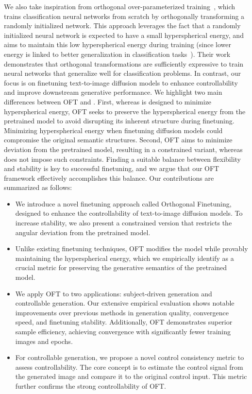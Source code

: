 We also take inspiration from orthogonal over-parameterized training~\cite{liu2021orthogonal}, which trains classification neural networks from scratch by orthogonally transforming a randomly initialized network. This approach leverages the fact that a randomly initialized neural network is expected to have a small hyperspherical energy, and \cite{liu2021orthogonal} aims to maintain this low hyperspherical energy during training (since lower energy is linked to better generalization in classification tasks~\cite{liu2018learning,lin2020regularizing}). Their work demonstrates that orthogonal transformations are sufficiently expressive to train neural networks that generalize well for classification problems. In contrast, our focus is on finetuning text-to-image diffusion models to enhance controllability and improve downstream generative performance. We highlight two main differences between OFT and \cite{liu2021orthogonal}. First, whereas \cite{liu2021orthogonal} is designed to minimize hyperspherical energy, OFT seeks to preserve the hyperspherical energy from the pretrained model to avoid disrupting its inherent structure during finetuning. Minimizing hyperspherical energy when finetuning diffusion models could compromise the original semantic structures. Second, OFT aims to minimize deviation from the pretrained model, resulting in a constrained variant, whereas \cite{liu2021orthogonal} does not impose such constraints. Finding a suitable balance between flexibility and stability is key to successful finetuning, and we argue that our OFT framework effectively accomplishes this balance. Our contributions are summarized as follows:

\begin{itemize}[leftmargin=*,nosep]

    \item We introduce a novel finetuning approach called Orthogonal Finetuning, designed to enhance the controllability of text-to-image diffusion models. To increase stability, we also present a constrained version that restricts the angular deviation from the pretrained model.
    \item Unlike existing finetuning techniques, OFT modifies the model while provably maintaining the hyperspherical energy, which we empirically identify as a crucial metric for preserving the generative semantics of the pretrained model.
    \item We apply OFT to two applications: subject-driven generation and controllable generation. Our extensive empirical evaluation shows notable improvements over previous methods in generation quality, convergence speed, and finetuning stability. Additionally, OFT demonstrates superior sample efficiency, achieving convergence with significantly fewer training images and epochs.
    \item For controllable generation, we propose a novel control consistency metric to assess controllability. The core concept is to estimate the control signal from the generated image and compare it to the original control input. This metric further confirms the strong controllability of OFT.
\end{itemize}

